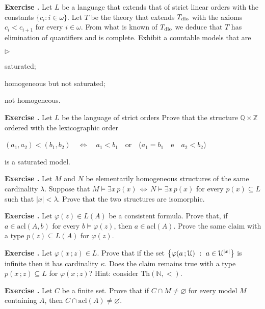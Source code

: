 \documentclass[10pt]{article}
\def\phi{\varphi}
\def\U{\EuScript U}
\def\ZZ{\mathds Z}
\def\NN{\mathds N}
\def\QQ{\mathds Q}
\def\E{\exists}
\def\0{\varnothing}
\def\IFF{\Leftrightarrow}
\def\Th{\textrm{Th}}
\def\acl{\textrm{acl}}
\newcommand{\labella}[1]{{\sf\footnotesize #1}\hfill}
\renewenvironment{itemize}
  {\begin{list}{$\triangleright$}{%
   \setlength{\parskip}{0mm}
   \setlength{\topsep}{0mm}
   \setlength{\rightmargin}{0mm}
   \setlength{\listparindent}{0mm}
   \setlength{\itemindent}{0mm}
   \setlength{\labelwidth}{3ex}
   \setlength{\itemsep}{0mm}
   \setlength{\parsep}{0mm}
   \setlength{\partopsep}{0mm}
   \setlength{\labelsep}{1ex}
   \setlength{\leftmargin}{\labelwidth+\labelsep}
   \let\makelabel\labella}}{%
   \end{list}}
\newcounter{ex}
\newenvironment{exercise}{\bigskip\addtocounter{ex}{1}\textbf{Exercise \theex.\quad}}{}
\begin{document}
\begin{exercise}
Let $L$ be a language that extends that of strict linear orders with the constants $\{c_i: i\in\omega\}$. Let $T$ be the theory that extends $T_{\rm dlo}$ with the axioms $c_i<c_{i+1}$ for every  $i\in\omega$.  From what is known of $T_{\rm dlo}$ we deduce that $T$ has elimination of quantifiers and is complete. Exhibit a countable models that are
\begin{itemize}
\item[1.] saturated;
\item[2.] homogeneous but not saturated;
\item[3.] not homogeneous.
\end{itemize}
\end{exercise}

\begin{exercise}
Let $L$ be the language of strict orders Prove that the structure $\QQ\times\ZZ$ ordered with the lexicographic order 

\hfil$(a_1,a_2)<(b_1,b_2)\quad\IFF\quad a_1<b_1$\ \ or\ \ ($a_1=b_1$\ \ e\ \ $a_2<b_2$)

is a saturated model.
\end{exercise}


\begin{exercise}
Let $M$ and $N$ be elementarily homogeneous structures of the same cardinality $\lambda$. Suppose that $M\models\E x\, p(x)\,\IFF\,N\models\E x\, p(x)$ for every $p(x)\subseteq L$ such that $|x|<\lambda$. Prove that the two structures are isomorphic.
\end{exercise}


\begin{exercise}
Let $\phi( z)\in L(A)$ be a consistent formula. Prove that, if $a\in\acl(A, b)$ for every $b\models\phi(z)$, then $a\in\acl(A)$. Prove the same claim with a type $p(z)\subseteq L(A)$ for $\phi(z)$.
\end{exercise}


\begin{exercise}
Let $\phi(x\,;z)\in L$. Prove that if the set $\big\{\phi(a\,;\U)\ :\ a\in\U^{|x|}\big\}$ is infinite then it has cardinality $\kappa$. Does the claim remains true with a type $p(x\,;z)\subseteq L$ for $\phi(x\,;z)$? Hint: consider $\Th(\NN,<)$.
\end{exercise}

\begin{exercise}
Let $C$ be a finite set. Prove that if $C\cap M\neq\0$ for every model $M$ containing $A$, then $C\cap\acl(A)\neq\0$.
\end{exercise}
\end{document}
